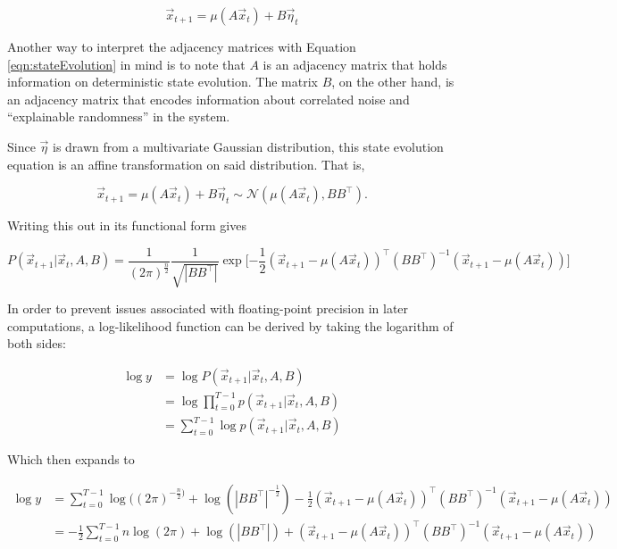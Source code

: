\documentclass[12pt]{article}
\theoremstyle{definition}
\begin{document}
\begin{equation}
    \label{eqn:stateEvolution}
    \Vec{x}_{t+1} = \mu(A\Vec{x}_t) + B\Vec{\eta}_t
\end{equation}


Another way to interpret the adjacency matrices with Equation \ref{eqn:stateEvolution} in mind is to note that $A$ is an adjacency matrix that holds information on deterministic state evolution. The matrix $B$, on the other hand, is an adjacency matrix that encodes information about correlated noise and ``explainable randomness'' in the system.

Since $\vec{\eta}$ is drawn from a multivariate Gaussian distribution, this state evolution equation is an affine transformation on said distribution. That is,

\begin{equation}
    \Vec{x}_{t+1} = \mu(A\Vec{x}_t) + B \Vec{\eta}_t \sim \mathcal{N}(\mu(A\Vec{x}_t), BB^\top).
\end{equation}

Writing this out in its functional form gives

\begin{equation}
    P(\Vec{x}_{t+1} | \Vec{x}_t, A, B) = \frac{1}{(2\pi)^{\frac{n}{2}}} \frac{1}{\sqrt{|BB^\top|}} \exp \big[{- \frac{1}{2}} (\Vec{x}_{t+1} - \mu(A\Vec{x}_t))^\top (BB^\top)^{-1} (\Vec{x}_{t+1} - \mu(A\Vec{x}_t)) \big]
\end{equation}

In order to prevent issues associated with floating-point precision in later computations, a log-likelihood function can be derived by taking the logarithm of both sides:

\begin{equation}
\begin{split}
    \log y & = \log P(\Vec{x}_{t+1} | \Vec{x}_t, A, B) \\ 
    & = \log \prod_{t=0}^{T - 1} p(\Vec{x}_{t+1} | \Vec{x}_t, A, B) \\ 
    & = \sum_{t=0}^{T - 1} \log p(\Vec{x}_{t+1} | \Vec{x}_t, A, B)
\end{split}
\end{equation}

Which then expands to 

\begin{equation}
\label{eqn:likelihoodFunction}
\begin{split}
    \log y &= \sum_{t=0}^{T - 1} \log((2\pi)^{-\frac{n}{2})} + \log(|BB^\top|^{-\frac{1}{2}}) - \frac{1}{2}(\Vec{x}_{t+1} - \mu(A\Vec{x}_t))^\top (BB^\top)^{-1} (\Vec{x}_{t+1} - \mu(A\Vec{x}_t)) \\ 
    &= - \frac{1}{2} \sum_{t=0}^{T - 1} n \log(2\pi) + \log(|BB^\top|) + (\Vec{x}_{t+1} - \mu(A\Vec{x}_t))^\top (BB^\top)^{-1} (\Vec{x}_{t+1} - \mu(A\Vec{x}_t))
\end{split}
\end{equation}
\end{document}
